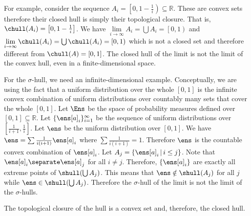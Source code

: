 \begin{mathSection}
\begin{remark}
	For example, consider the sequence $A_i = \left[0, 1-\frac{1}{i}\right) \subseteq \mathbb{R}$. These are convex sets therefore their closed hull is simply their topological closure. That is, $\chull(A_i) = \left[0, 1-\frac{1}{i}\right]$. We have $\lim\limits_{i \to \infty} A_i = \bigcup A_i = \left[0, 1\right)$ and $\lim\limits_{i \to \infty} \chull(A_i) = \bigcup \chull(A_i) = \left[0, 1\right)$ which is not a closed set and therefore different from $\chull(A) = [0,1]$. The closed hull of the limit is not the limit of the convex hull, even in a finite-dimensional space.
	
	For the $\sigma$-hull, we need an infinite-dimensional example. Conceptually, we are using the fact that a uniform distribution over the whole $[0,1]$ is the infinite convex combination of uniform distributions over countably many sets that cover the whole $[0,1]$. Let $\Ens$ be the space of probability measures defined over $[0,1] \subseteq \mathbb{R}$. Let $\{\ens[a]_i\}_{i=1}^{\infty}$ be the sequence of uniform distributions over $\left[\frac{1}{i+1}, \frac{1}{i}\right]$. Let $\ens$ be the uniform distribution over $[0,1]$. We have $\ens = \sum \frac{1}{i(i+1)} \ens[a]_i$ where $\sum \frac{1}{i(i+1)} = 1$. Therefore $\ens$ is the countable convex combination of $\ens[a]_i$. Let $A_j = \{ \ens[a]_i \, | \, i \leq j\}$. Note that $\ens[a]_i \separate \ens[a]_j$ for all $i \neq j$. Therefore, $\{\ens[a]_i\}$ are exactly all extreme points of $\shull(\bigcup A_j)$. This means that $\ens \notin \shull(A_j)$ for all $j$ while $\ens \in \shull(\bigcup A_j)$. Therefore the $\sigma$-hull of the limit is not the limit of the $\sigma$-hulls.
\end{remark}


\begin{prop}
	The topological closure of the hull is a convex set and, therefore, the closed hull.
\end{prop}


\end{mathSection}
